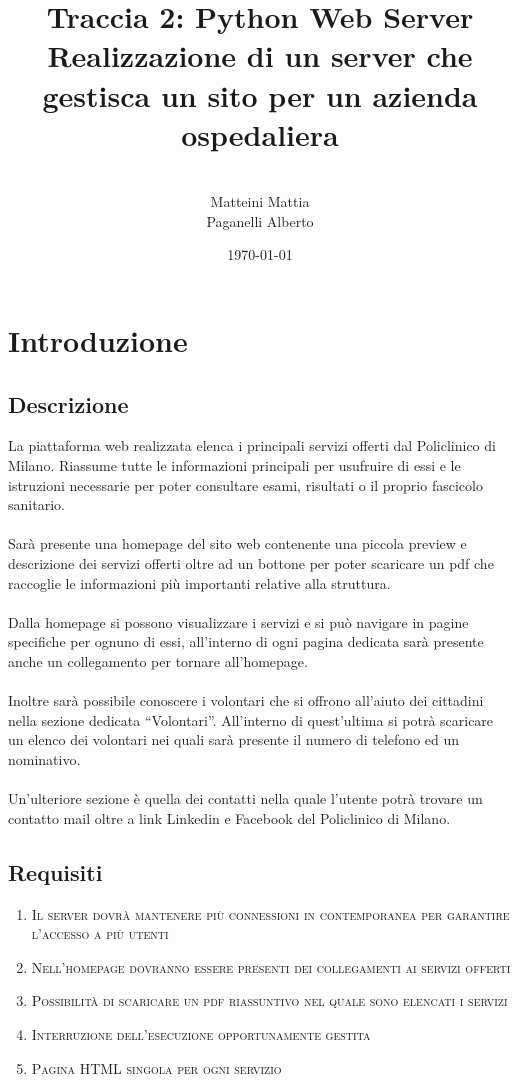 \documentclass[a4paper,12pt]{report}
\title{\textbf{Traccia 2: Python Web Server}
Realizzazione di un server che gestisca un sito per un azienda ospedaliera}
\author{
\\Matteini Mattia
\\Paganelli Alberto
}
\date{\today}
\begin{document}
\maketitle

\tableofcontents


\chapter{Introduzione}

\section{Descrizione}
La piattaforma web realizzata elenca i principali servizi offerti dal Policlinico di Milano.
Riassume tutte le informazioni principali per usufruire di essi e le istruzioni necessarie per poter consultare esami, risultati o il proprio fascicolo sanitario.
\\
\\
Sarà presente una homepage del sito web contenente una piccola preview e descrizione  dei servizi offerti oltre ad un bottone per poter scaricare un pdf che raccoglie le informazioni più importanti relative alla struttura. 
\\
\\
Dalla homepage si possono visualizzare i servizi e si può navigare in pagine specifiche per ognuno di essi, all’interno di ogni pagina dedicata sarà presente anche un collegamento per tornare all’homepage.
\\
\\
Inoltre sarà possibile conoscere i volontari che si offrono all’aiuto dei cittadini nella sezione dedicata “Volontari”. 
All’interno di quest’ultima si potrà scaricare un elenco dei volontari nei quali sarà presente il numero di telefono ed un nominativo.
\\
\\
Un'ulteriore sezione è quella dei contatti nella quale l’utente potrà trovare un contatto mail oltre a link Linkedin e Facebook del Policlinico di Milano.


\clearpage

\section{Requisiti}

\begin{enumerate}
    \item \textsc{Il server dovrà mantenere più connessioni in contemporanea per garantire l'accesso a più utenti}
    \item \textsc{Nell’homepage dovranno essere presenti dei collegamenti ai servizi offerti}
    \item \textsc{Possibilità di scaricare un pdf riassuntivo nel quale sono elencati i servizi}
    \item \textsc{Interruzione dell'esecuzione opportunamente gestita}
    \item \textsc{Pagina HTML singola per ogni servizio}
\end{enumerate}
 
\end{document}
